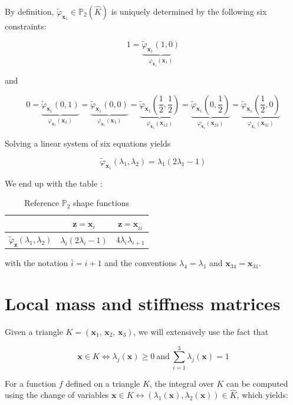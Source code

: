\documentclass{article}
\theoremstyle{definition}
\theoremstyle{proposition}
\theoremstyle{theorem}
\theoremstyle{remark}
\theoremstyle{corollary}  %
\theoremstyle{exercise}
\theoremstyle{lemma}
\begin{document}
By definition, $\tilde{\varphi}_{\bm x_1} \in \mathbb{P}_2(\hat{K})$ is uniquely determined by the following six constraints:

$$1 = \underbrace{\tilde{\varphi}_{\bm x_1}(1, 0)}_{\varphi_{\bm x_1}(\bm x_1)}$$

and 

$$0 = \underbrace{\tilde{\varphi}_{\bm x_1}(0, 1)}_{\varphi_{\bm x_1}(\bm x_2)} = \underbrace{\tilde{\varphi}_{\bm x_1}(0, 0)}_{\varphi_{\bm x_1}(\bm x_3)} = \underbrace{\tilde{\varphi}_{\bm x_1}\left(\frac{1}{2}, \frac{1}{2}\right)}_{\varphi_{\bm x_1}(\bm x_{12})} = \underbrace{\tilde{\varphi}_{\bm x_1}\left(0, \frac{1}{2}\right)}_{\varphi_{\bm x_1}(\bm x_{23})} = \underbrace{\tilde{\varphi}_{\bm x_1}\left(\frac{1}{2}, 0\right)}_{\varphi_{\bm x_1}(\bm x_{31})}$$

Solving a linear system of six equations yields 

$$\tilde{\varphi}_{\bm x_1}(\lambda_1, \lambda_2) = \lambda_1(2\lambda_1 - 1)$$

We end up with the table : 

\begin{table}[H]
\centering
\begin{tabular}{|c|c|c|}
\hline
 & $\bm z = \bm x_i$ & $\bm z = \bm x_{i \bar{i}}$ \\
\hline
$\tilde{\varphi}_{\bm z}(\lambda_1, \lambda_2)$
& $\lambda_i(2\lambda_i - 1)$  & $4\lambda_i\lambda_{i+1}$ \\
\hline
\end{tabular}
\caption{Reference $\mathbb{P}_2$ shape functions}
\end{table}

with the notation $\bar{i} = i+1$ and the conventions $\lambda_4 = \lambda_1$ and $\bm x_{34} = \bm x_{31}$.

\section{Local mass and stiffness matrices}

Given a triangle $K = (\bm x_1, \, \bm x_2, \, \bm x_3)$, we will extensively use the fact that 

$$\bm x\in K \Leftrightarrow \lambda_j(\bm x) \geq 0 \ \text{and} \ \sum_{i=1}^3\lambda_j(\bm x)=1$$

For a function $f$ defined on a triangle $K$, the integral over $K$ can be computed using the change of variables $\bm x \in K \leftrightarrow (\lambda_1(\bm x), \lambda_2(\bm x)) \in \hat{K}$, which yields:
\end{document}
